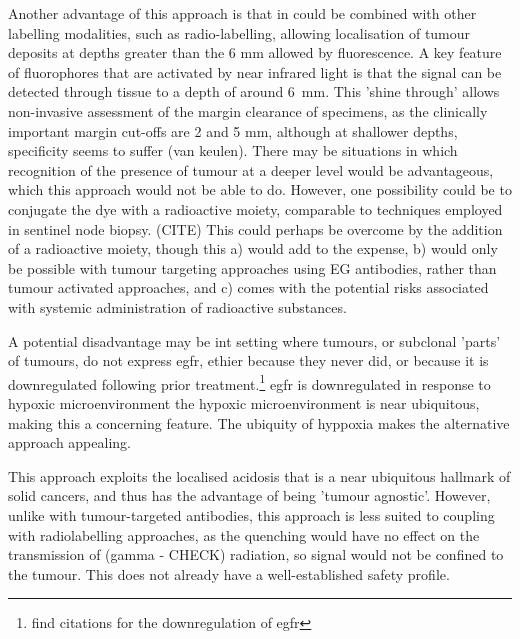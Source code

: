 Another advantage of this approach is that in could be combined with other labelling modalities, such as radio-labelling, allowing localisation of tumour deposits at depths greater than the 6 mm allowed by fluorescence.
A key feature of fluorophores that are activated by near infrared light is that the signal can be detected through tissue to a depth of around \SI{6}{\milli\meter}.
This 'shine through' allows non-invasive assessment of the margin clearance of specimens, as the clinically important margin cut-offs are 2 and 5 mm, although at shallower depths, specificity seems to suffer (van keulen).
There may be situations in which recognition of the presence of tumour at a deeper level would be advantageous, which this approach would not be able to do.
However, one possibility could be to conjugate the dye with a radioactive moiety, comparable to techniques employed in sentinel node biopsy. (CITE)
This could perhaps be overcome by the addition of a radioactive moiety, though this a) would add to the expense, b) would only be possible with tumour targeting approaches using EG antibodies, rather than tumour activated approaches, and c) comes with the potential risks associated with systemic administration of radioactive substances.




A potential disadvantage  may be int setting where tumours, or subclonal 'parts' of tumours, do not express \gls{egfr}, ethier because they never did, or because it is downregulated following prior treatment.\footnote{find citations for the downregulation of egfr}
egfr is downregulated in response to hypoxic microenvironment \cite{mayerDownregulationEGFRHypoxic2016}
the hypoxic microenvironment is near ubiquitous, making this a concerning feature.
The ubiquity of hyppoxia makes the alternative approach appealing.

This approach exploits the localised acidosis that is a near ubiquitous hallmark of solid cancers, and thus has the advantage of being 'tumour agnostic'.
However, unlike with tumour-targeted antibodies, this approach is less suited to coupling with radiolabelling approaches, as the quenching would have no effect on the transmission of (gamma - CHECK) radiation, so signal would not be confined to the tumour.
This does not already have a well-established safety profile.


